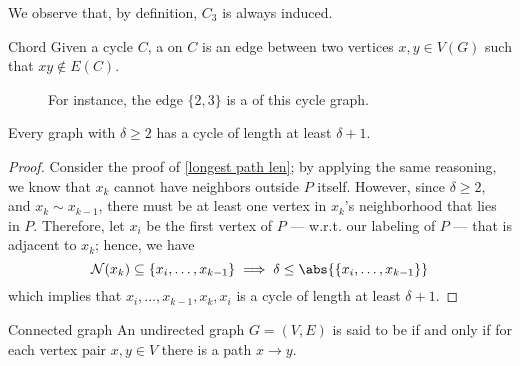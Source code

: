 \documentclass[a4paper, 12pt]{report}
\begin{document}
    We observe that, by definition, $C_3$ is always induced.

    \begin{frameddefn}{Chord}
        Given a cycle $C$, a  on $C$ is an edge between two vertices $x, y \in V(G)$ such that $xy \notin E(C)$.
    \end{frameddefn}

    \begin{figure}[H]
        \centering
        \caption{For instance, the edge $\{2,3\}$ is a  of this cycle graph.}
    \end{figure}

    \begin{framedprop}[label={min deg 2}]{}
        Every graph with $\delta \ge 2$ has a cycle of length at least $\delta + 1$.
    \end{framedprop}

    \begin{proof}
        Consider the proof of \cref{longest path len}; by applying the same reasoning, we know that $x_k$ cannot have neighbors outside $P$ itself. However, since $\delta \ge 2$, and $x_k \sim x_{k - 1}$, there must be at least one vertex in $x_k$'s neighborhood that lies in $P$. Therefore, let $x_i$ be the first vertex of $P$ --- w.r.t. our labeling of $P$ --- that is adjacent to $x_k$; hence, we have $$\mathcal N (x_k) \subseteq \{x_i, \ldots, x_{k - 1}\} \implies \delta \le \abs{\{x_i, \ldots, x_{k - 1}\}}$$ which implies that $x_i, \ldots, x_{k - 1}, x_k, x_i$ is a cycle of length at least $\delta + 1$.
    \end{proof}

    \begin{frameddefn}{Connected graph}
        An undirected graph $G = (V, E)$ is said to be  if and only if for each vertex pair $x, y \in V$ there is a path $x \to y$.
    \end{frameddefn}
\end{document}
